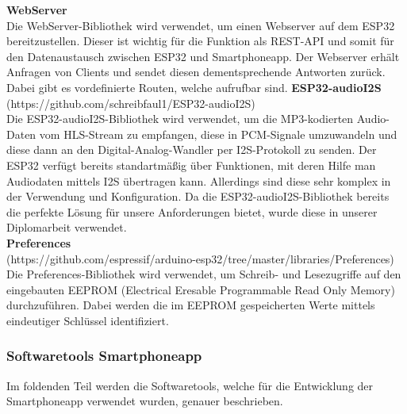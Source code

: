 \documentclass[11pt, twoside]{article}
\begin{document}
\vspace{4mm}\newline
\textbf{WebServer} \\
Die WebServer-Bibliothek wird verwendet, um einen Webserver auf dem ESP32 bereitzustellen. Dieser ist wichtig für die Funktion als REST-API und somit für den Datenaustausch zwischen ESP32 und Smartphoneapp. Der Webserver erhält Anfragen von Clients und sendet diesen dementsprechende Antworten zurück. Dabei gibt es vordefinierte Routen, welche aufrufbar sind.
\vspace{4mm}\newline
\textbf{ESP32-audioI2S} \\
(https://github.com/schreibfaul1/ESP32-audioI2S) \\
Die ESP32-audioI2S-Bibliothek wird verwendet, um die MP3-kodierten Audio-Daten vom HLS-Stream zu empfangen, diese in PCM-Signale umzuwandeln und diese dann an den Digital-Analog-Wandler per I2S-Protokoll zu senden. Der ESP32 verfügt bereits standartmäßig über Funktionen, mit deren Hilfe man Audiodaten mittels I2S übertragen kann. Allerdings sind diese sehr komplex in der Verwendung und Konfiguration. Da die ESP32-audioI2S-Bibliothek bereits die perfekte Lösung für unsere Anforderungen bietet, wurde diese in unserer Diplomarbeit verwendet. \newline \\
\textbf{Preferences} \\
(https://github.com/espressif/arduino-esp32/tree/master/libraries/Preferences)
Die Preferences-Bibliothek wird verwendet, um Schreib- und Lesezugriffe auf den eingebauten EEPROM (Electrical Eresable Programmable Read Only Memory) durchzuführen. Dabei werden die im EEPROM gespeicherten Werte mittels eindeutiger Schlüssel identifiziert.
\subsubsection{Softwaretools Smartphoneapp}
Im foldenden Teil werden die Softwaretools, welche für die Entwicklung der Smartphoneapp verwendet wurden, genauer beschrieben. \\
\end{document}
